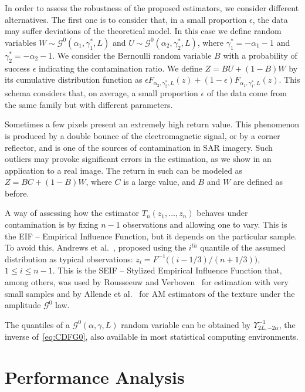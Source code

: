 \documentclass[twocolumn]{svjour3}
\begin{document}
	In order to assess the robustness of the proposed estimators, we consider different alternatives. 
	The first one is to consider that, in a small proportion $\epsilon$, the data may suffer deviations of the theoretical model. 
	In this case we define random variables $W \sim \mathcal{G}^0(\alpha_1,\gamma_1^*,L)$ and $U \sim \mathcal{G}^0(\alpha_2,\gamma_2^*,L)$, where $\gamma_1^*=-\alpha_1-1$ and  $\gamma_2^*=-\alpha_2-1$. 
	We consider the Bernoulli random variable $B$ with a probability of success $\epsilon$ indicating the contamination ratio.   
	We define $Z=BU+(1-B)W$ by its cumulative distribution function as
	$
	\epsilon {F}_{\alpha_2,\gamma_2^*,L}(z)+(1-\epsilon) {F}_{\alpha_1,\gamma_1^*,L}(z)
	$.
	This schema considers that, on average, a small proportion $\epsilon$ of the data come from the same family but with different parameters. 
	
	Sometimes a few pixels present an extremely high return value. 
	This phenomenon is produced by a double bounce of the electromagnetic signal, or by a corner reflector, and is one of the sources of contamination in SAR imagery. 
	Such outliers may provoke significant errors in the estimation, as we show in an application to a real image. 
	The return in such can be modeled as $Z=BC+(1-B)W$, where $C$ is a large value, and $B$ and $W$ are defined as before.
	
	A way of assessing how the estimator $T_n(z_1,\dots,z_n)$ behaves under contamination is by fixing $n-1$ observations and allowing one to vary.
	This is the EIF -- Empirical Influence Function, but it depends on the particular sample.
	To avoid this, Andrews et al.~\cite{Andrews1972}, proposed using the $i^{th}$ quantile of the assumed distribution as typical observations: $z_i=F^{-1}\big((i-1/3)/(n+1/3) \big)$, $1\leq i\leq n-1$.
	This is the SEIF -- Stylized Empirical Influence Function that, among others, was used by Rousseeuw and Verboven~\cite{RousseeuwCSDA} for estimation with very small samples and by Allende et al.~\cite{AllendeFreryetal:JSCS:05} for AM estimators of the texture under the amplitude $\mathcal G^0$ law.
	
	The quantiles of a $\mathcal G^0(\alpha,\gamma,L)$ random variable can be obtained by $\Upsilon^{-1}_{2L,-2\alpha}$, the inverse of~\eqref{eq:CDFG0}, also available in most statistical computing environments.
	
	
	\section{Performance Analysis}\label{simulation}
	
\end{document}

